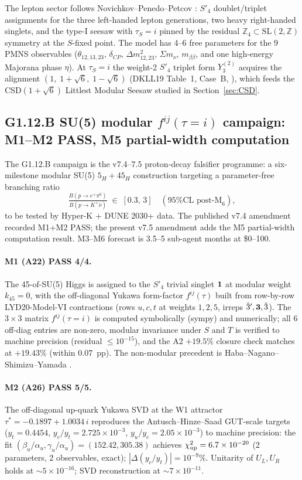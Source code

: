 \documentclass[a4paper,11pt]{article}
\newcommand{\Spf}{S'_4}
\theoremstyle{definition}
\theoremstyle{remark}
\begin{document}
The lepton sector follows Novichkov--Penedo--Petcov
\cite{NPP20}: $\Spf$ doublet/triplet assignments for the three
left-handed lepton generations, two heavy right-handed singlets,
and the type-I seesaw with $\tau_S=i$ pinned by the residual
$\mathbb{Z}_4\subset\mathrm{SL}(2,\mathbb{Z})$ symmetry at the
$S$-fixed point.  The model has 4--6 free parameters for the 9
PMNS observables ($\theta_{12,13,23},\,\delta_{CP},\,
\Delta m_{12,23}^{2},\,\Sigma m_\nu,\,m_{\beta\beta}$, and one
high-energy Majorana phase $\eta$).  At $\tau_S=i$ the weight-2
$\Spf$ triplet form $Y_3^{(2)}$ acquires the alignment
$(1,\;1+\sqrt{6},\;1-\sqrt{6})$ (DKLL19 Table~1, Case~B,
\cite{DKLL19}), which feeds the CSD$(1+\sqrt 6)$ Littlest Modular
Seesaw studied in Section~\ref{sec:CSD}.

\subsection{G1.12.B SU(5) modular $f^{ij}(\tau=i)$
            campaign: M1--M2 PASS, M5 partial-width computation}
\label{sec:G112B}

The G1.12.B campaign \cite{A18scoping} is the v7.4--7.5
proton-decay falsifier programme: a six-milestone modular SU(5)
$5_H+45_H$ construction targeting a parameter-free branching
ratio
\[
  \tfrac{B(p\to e^+\pi^0)}{B(p\to K^+\bar\nu)} \;\in\; [0.3,\,3]
  \quad(\text{95\% CL post-M}_6),
\]
to be tested by Hyper-K + DUNE 2030+ data.  The published v7.4
amendment recorded M1+M2 PASS; the present v7.5 amendment adds
the M5 partial-width computation result.  M3--M6 forecast is
3.5--5 sub-agent months at \$0--100.

\paragraph{M1 (A22) PASS 4/4.}  The 45-of-SU(5) Higgs is assigned
to the $\Spf$ trivial singlet ${\bf 1}$ at modular weight
$k_{45}=0$, with the off-diagonal Yukawa form-factor
$f^{ij}(\tau)$ built from row-by-row LYD20-Model-VI contractions
(rows $u,c,t$ at weights $1,2,5$, irreps
$\hat 3',{\bf 3},\hat 3$).  The $3\times 3$ matrix
$f^{ij}(\tau=i)$ is computed symbolically (sympy) and
numerically; all 6 off-diag entries are non-zero, modular
invariance under $S$ and $T$ is verified to machine precision
(residual $\le 10^{-15}$), and the A2 $+19.5\%$ closure check
matches at $+19.43\%$ (within $0.07$~pp).  The non-modular
precedent is Haba--Nagano--Shimizu--Yamada
\cite{HabaNagShim24}.

\paragraph{M2 (A26) PASS 5/5.}  The off-diagonal up-quark Yukawa
SVD at the W1 attractor $\tau^{*}=-0.1897+1.0034\,i$ reproduces
the Antusch--Hinze--Saad GUT-scale
targets~\cite{AHS25} ($y_t=0.4454$, $y_c/y_t=2.725\times 10^{-3}$,
$y_u/y_c=2.05\times 10^{-3}$) to machine precision: the fit
$(\beta_u/\alpha_u,\gamma_u/\alpha_u)=(152.42,305.38)$ achieves
$\chi^2_{\rm up}=6.7\times 10^{-20}$ (2 parameters, 2 observables,
exact); $|\Delta(y_c/y_t)|=10^{-9}\%$.  Unitarity of $U_L,U_R$
holds at $\sim 5\times 10^{-16}$; SVD reconstruction at
$\sim 7\times 10^{-11}$.
\end{document}
